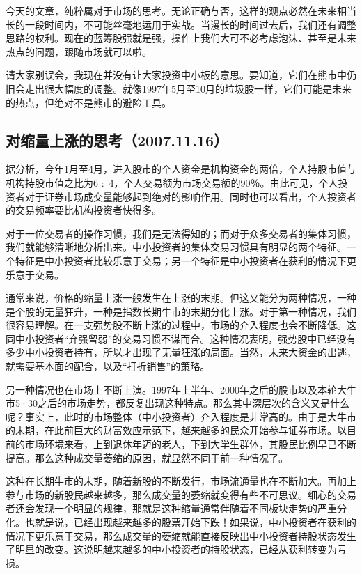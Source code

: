 今天的文章，纯粹属对于市场的思考。无论正确与否，这样的观点必然在未来相当长的一段时间内，不可能丝毫地运用于实战。当漫长的时间过去后，我们还有调整思路的权利。现在的蓝筹股强就是强，操作上我们大可不必考虑泡沫、甚至是未来热点的问题，跟随市场就可以啦。

请大家别误会，我现在并没有让大家投资中小板的意思。要知道，它们在熊市中仍旧会走出很大幅度的调整。就像1997年5月至10月的垃圾股一样，它们可能是未来的热点，但绝对不是熊市的避险工具。

\subsection{对缩量上涨的思考（2007.11.16）}

据分析，今年1月至4月，进入股市的个人资金是机构资金的两倍，个人持股市值与机构持股市值之比为6 $:$ 4，个人交易额为市场交易额的90％。由此可见，个人投资者对于证券市场成交量能够起到绝对的影响作用。同时也可以看出，个人投资者的交易频率要比机构投资者快得多。

对于一位交易者的操作习惯，我们是无法得知的；而对于众多交易者的集体习惯，我们就能够清晰地分析出来。中小投资者的集体交易习惯具有明显的两个特征。一个特征是中小投资者比较乐意于交易；另一个特征是中小投资者在获利的情况下更乐意于交易。

通常来说，价格的缩量上涨一般发生在上涨的末期。但这又能分为两种情况，一种是个股的无量狂升，一种是指数长期牛市的末期分化上涨。对于第一种情况，我们很容易理解。在一支强势股不断上涨的过程中，市场的介入程度也会不断降低。这同中小投资者“弃强留弱”的交易习惯不谋而合。这种情况表明，强势股中已经没有多少中小投资者持有，所以才出现了无量狂涨的局面。当然，未来大资金的出逃，就需要基本面的配合，以及“打折销售”的策略。

另一种情况也在市场上不断上演。1997年上半年、2000年之后的股市以及本轮大牛市5·30之后的市场走势，都反复出现这种特点。那么其中深层次的含义又是什么呢？事实上，此时的市场整体（中小投资者）介入程度是非常高的。由于是大牛市的末期，在此前巨大的财富效应示范下，越来越多的民众开始参与证券市场。以目前的市场环境来看，上到退休年迈的老人，下到大学生群体，其股民比例早已不断提高。那么这种成交量萎缩的原因，就显然不同于前一种情况了。

这种在长期牛市的末期，随着新股的不断发行，市场流通量也在不断加大。再加上参与市场的新股民越来越多，那么成交量的萎缩就变得有些不可思议。细心的交易者还会发现一个明显的规律，那就是这种缩量通常伴随着不同板块走势的严重分化。也就是说，已经出现越来越多的股票开始下跌！如果说，中小投资者在获利的情况下更乐意于交易，那么成交量的萎缩就能直接反映出中小投资者持股状态发生了明显的改变。这说明越来越多的中小投资者的持股状态，已经从获利转变为亏损。

